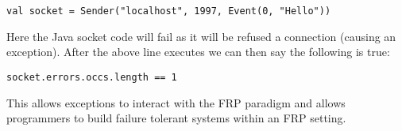 \begin{verbatim}
val socket = Sender("localhost", 1997, Event(0, "Hello")) 
\end{verbatim}

  Here the Java socket code will fail as it will be refused a connection (causing an exception). After the above line 
  executes we can then say the following is true:

\begin{verbatim}
socket.errors.occs.length == 1 
\end{verbatim}

  This allows exceptions to interact with the FRP paradigm and allows programmers to build failure tolerant systems within 
  an FRP setting.